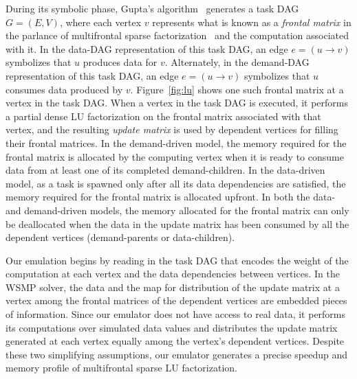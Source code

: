 \documentclass[10pt,conference]{IEEEtran}
\begin{document}
During its symbolic phase, Gupta's algorithm~\cite{GUPTAsimax01} generates a
task DAG $G =(E,V)$, where each vertex $v$ represents what is known as a
\textit{frontal matrix} in the parlance of multifrontal sparse
factorization~\cite{DUFF84siam} and the computation associated with it.  In the
data-DAG representation of this task DAG, an edge $e = (u \rightarrow{} v)$
symbolizes that $u$ produces data for $v$.  Alternately, in the demand-DAG
representation of this task DAG, an edge $e = (u \rightarrow{} v)$ symbolizes
that $u$ consumes data produced by $v$.  Figure~\ref{fig:lu} shows one such
frontal matrix at a vertex in the task DAG.  When a vertex in the task DAG is
executed, it performs a partial dense LU factorization on the frontal matrix
associated with that vertex, and the resulting \textit{update matrix} is used
by dependent vertices for filling their frontal matrices.  In the demand-driven
model, the memory required for the frontal matrix is allocated by the computing
vertex when it is ready to consume data from at least one of its completed
demand-children. In the data-driven model, as a task is spawned only after all
its data dependencies are satisfied, the memory required for the frontal matrix
is allocated upfront.  In both the data- and demand-driven models, the memory
allocated for the frontal matrix can only be deallocated when the data in the
update matrix has been consumed by all the dependent vertices (demand-parents
or data-children).

Our emulation begins by reading in the task DAG that encodes the weight of the
computation at each vertex and the data dependencies between vertices.  In the
WSMP solver, the data and the map for distribution of the update matrix at a
vertex among the frontal matrices of the dependent vertices are embedded pieces
of information.
Since our emulator does not have access to real data, it performs its
computations over simulated data values and distributes the update matrix
generated at each vertex equally among the vertex's dependent vertices.
Despite these two simplifying assumptions, our emulator generates a precise
speedup and memory profile of multifrontal sparse LU factorization.
\end{document}
